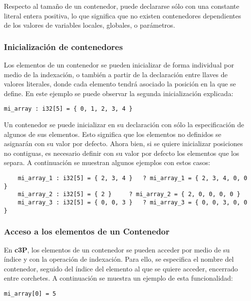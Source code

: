 Respecto al tamaño de un contenedor, puede declararse sólo con una constante literal
entera positiva, lo que significa que no existen contenedores dependientes de los
valores de variables locales, globales, o parámetros.

\subsubsection{Inicialización de contenedores}

Los elementos de un contenedor se pueden inicializar de forma individual por medio de
la indexación, o también a partir de la declaración entre llaves de valores literales,
donde cada elemento tendrá asociado la posición en la que se define. En este ejemplo
se puede observar la segunda inicialización explicada:

\begin{verbatim}
mi_array : i32[5] = { 0, 1, 2, 3, 4 }
\end{verbatim}

Un contenedor se puede inicializar en su declaración con sólo la especificación de algunos
de sus elementos. Esto significa que los elementos no definidos se asignarán con su valor
por defecto. Ahora bien, si se quiere inicializar posiciones no contiguas, es necesario
definir con su valor por defecto los elementos que los separa. A continuación se muestran
algunos ejemplos con estos casos:

\begin{verbatim}
	mi_array_1 : i32[5] = { 2, 3, 4 }	? mi_array_1 = { 2, 3, 4, 0, 0 }
	mi_array_2 : i32[5] = { 2 }		? mi_array_2 = { 2, 0, 0, 0, 0 }
	mi_array_3 : i32[5] = { 0, 0, 3 }	? mi_array_3 = { 0, 0, 3, 0, 0 }
\end{verbatim}

\subsubsection{Acceso a los elementos de un Contenedor}

En \textbf{c3P}, los elementos de un contenedor se pueden acceder por medio de su índice y
con la operación de indexación. Para ello, se especifica el nombre del contenedor, seguido
del índice del elemento al que se quiere acceder, encerrado entre corchetes. A continuación
se muestra un ejemplo de esta funcionalidad:

\begin{verbatim}
mi_array[0] = 5
\end{verbatim}

